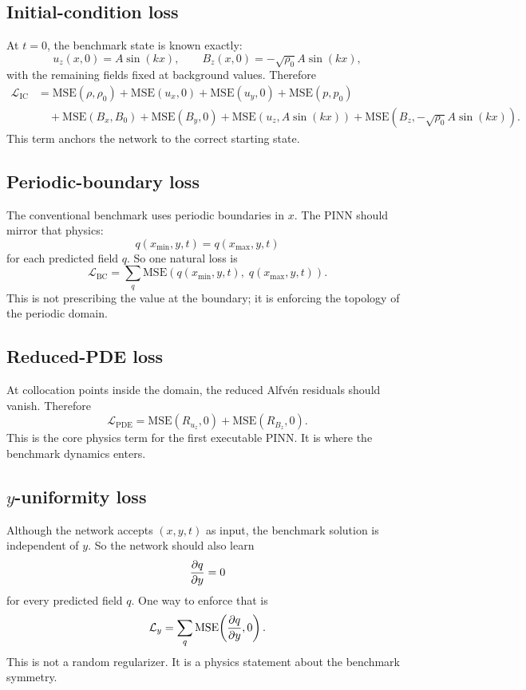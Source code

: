 \documentclass[11pt]{article}
\begin{document}
\subsection{Initial-condition loss}
At $t=0$, the benchmark state is known exactly:
\begin{equation}
u_z(x,0)=A\sin(kx),\qquad
B_z(x,0)=-\sqrt{\rho_0}A\sin(kx),
\label{eq:m3-ic-active}
\end{equation}
with the remaining fields fixed at background values. Therefore
\begin{align}
\mathcal{L}_{\mathrm{IC}}
&=
\mathrm{MSE}(\rho,\rho_0)
+
\mathrm{MSE}(u_x,0)
+
\mathrm{MSE}(u_y,0)
+
\mathrm{MSE}(p,p_0)
\nonumber\\
&\quad
+
\mathrm{MSE}(B_x,B_0)
+
\mathrm{MSE}(B_y,0)
+
\mathrm{MSE}(u_z,A\sin(kx))
+
\mathrm{MSE}(B_z,-\sqrt{\rho_0}A\sin(kx)).
\label{eq:m3-lic}
\end{align}
This term anchors the network to the correct starting state.

\subsection{Periodic-boundary loss}
The conventional benchmark uses periodic boundaries in $x$. The PINN should mirror that physics:
\begin{equation}
q(x_{\min},y,t)=q(x_{\max},y,t)
\end{equation}
for each predicted field $q$. So one natural loss is
\begin{equation}
\mathcal{L}_{\mathrm{BC}}
=
\sum_{q}
\mathrm{MSE}\!\left(
q(x_{\min},y,t),\;
q(x_{\max},y,t)
\right).
\label{eq:m3-lbc}
\end{equation}
This is not prescribing the value at the boundary; it is enforcing the topology of the periodic domain.

\subsection{Reduced-PDE loss}
At collocation points inside the domain, the reduced Alfv\'en residuals should vanish. Therefore
\begin{equation}
\mathcal{L}_{\mathrm{PDE}}
=
\mathrm{MSE}(R_{u_z},0)
+
\mathrm{MSE}(R_{B_z},0).
\label{eq:m3-lpde}
\end{equation}
This is the core physics term for the first executable PINN. It is where the benchmark dynamics enters.

\subsection{$y$-uniformity loss}
Although the network accepts $(x,y,t)$ as input, the benchmark solution is independent of $y$. So the network should also learn
\begin{equation}
\pdv{q}{y}=0
\end{equation}
for every predicted field $q$. One way to enforce that is
\begin{equation}
\mathcal{L}_{y}
=
\sum_{q}
\mathrm{MSE}\!\left(\pdv{q}{y},0\right).
\label{eq:m3-ly}
\end{equation}
This is not a random regularizer. It is a physics statement about the benchmark symmetry.
\end{document}
